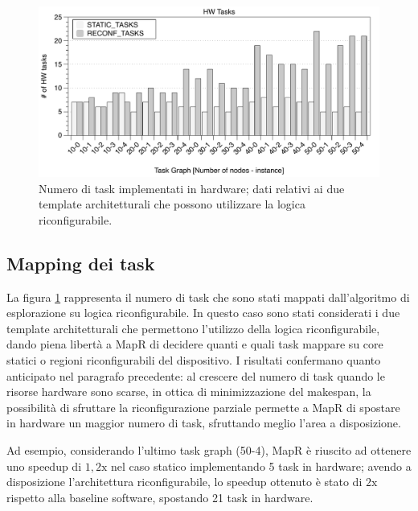 \begin{figure}[t]
 \begin{center}
  \includegraphics[width=\textwidth]{./capitoli/figure/cap6/FPL_HWtasks.pdf}
  \caption[Numero di task implementati in hardware.]{Numero di task implementati in hardware; dati relativi ai due template architetturali
  che possono utilizzare la logica riconfigurabile.}
  \label{fig:hardwareTask}
 \end{center}
\end{figure}

\subsection{Mapping dei task}
La figura \ref{fig:hardwareTask} rappresenta il numero di task che sono stati mappati
dall'algoritmo di esplorazione su logica riconfigurabile.
In questo caso sono stati considerati i due template architetturali che permettono
l'utilizzo della logica riconfigurabile, dando piena libert\`a
a MapR di decidere quanti e quali task mappare su core statici o regioni riconfigurabili del dispositivo.
I risultati confermano quanto anticipato nel paragrafo precedente: al crescere del numero di
task quando le risorse hardware sono scarse, in ottica di minimizzazione del makespan, la possibilit\`a di sfruttare
la riconfigurazione parziale permette a MapR di spostare
in hardware un maggior numero di task, sfruttando meglio l'area a disposizione.

Ad esempio, considerando l'ultimo task graph (50-4), MapR \`e riuscito ad ottenere uno speedup di
$1,2\text{x}$ nel caso statico implementando 5 task in hardware; avendo a disposizione l'architettura
riconfigurabile, lo speedup ottenuto \`e stato di $2\text{x}$ rispetto alla baseline software,
spostando 21 task in hardware.

